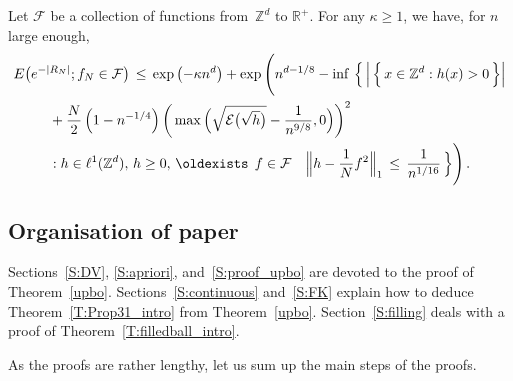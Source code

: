 \documentclass[AHL, Unicode, longabstracts, published]{cedram}
\newcommand*\Zd {{\mathbb Z^d}}
\newcommand*\R{\mathbb{R}}
\newcommand{\cE}{\mathcal{E}}
\newcommand{\cF}{\mathcal{F}}
\renewcommand*{\exists}{\mathrel{\oldexists}}
\begin{document}
\begin{theo}\label{upbo}
Let $\cF$ be a collection of functions from~$\Zd$ to $\R^+$. For any $\kappa\geq 1$, we have, for $n$ large enough,
\begin{multline*}
E\big(e^{-|R_N|}; f_N\in\cF\big)\,\leq\,
\exp\left(-\kappa n^d\right)+
\exp\Bigg(n^{d-1/8}-
\inf\,\Big\{\,
\Big|\,\Big\{\,x\in \Zd: h(x)>0
\,\Big\}\Big|\\
\begin{aligned}
&+\frac{N}{2} \left(1-n^{-1/4}\right)
\bigg(\max\Big(
\sqrt{\cE\big(\sqrt{h}\big)}-
\frac{1}{n^{9/8}},0\Big) \bigg)^2
\\
&:h\in \ell^1(\Zd),\,h \geq 0,\,
\exists\,f\in\cF\quad
\Big\|h-\frac{1}{N}f^2\Big\|_{1}
\,\leq\,\frac{1}{n^{1/16}}
\,\Big\}\Bigg)\,.
\end{aligned}
\end{multline*}
\end{theo}

\subsection{Organisation of paper}

Sections~\ref{S:DV}, \ref{S:apriori}, and~\ref{S:proof_upbo} are devoted to the proof of Theorem~\ref{upbo}. Sections~\ref{S:continuous} and~\ref{S:FK} explain how to deduce Theorem~\ref{T:Prop31_intro} from Theorem~\ref{upbo}. Section~\ref{S:filling} deals with a proof of Theorem~\ref{T:filledball_intro}.

As the proofs are rather lengthy, let us sum up the main steps of the proofs.

\end{document}
